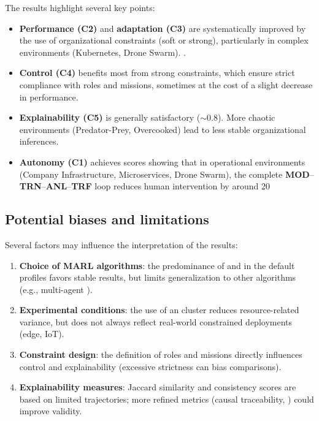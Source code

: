   The results highlight several key points:
  \begin{itemize}
  \item \textbf{Performance (C2)} and \textbf{adaptation (C3)} are systematically improved by the use of organizational constraints (soft or strong), particularly in complex environments (Kubernetes, Drone Swarm).
  .
  \item \textbf{Control (C4)} benefits most from strong constraints, which ensure strict compliance with roles and missions, sometimes at the cost of a slight decrease in performance.
  \item \textbf{Explainability (C5)} is generally satisfactory ($\sim 0.8$). More chaotic environments (Predator-Prey, Overcooked) lead to less stable organizational inferences.
  \item \textbf{Autonomy (C1)} achieves scores showing that in operational environments (Company Infrastructure, Microservices, Drone Swarm), the complete \textbf{MOD}–\textbf{TRN}–\textbf{ANL}–\textbf{TRF} loop reduces human intervention by around 20%
  \end {itemize}

  \subsection{Potential biases and limitations}

  Several factors may influence the interpretation of the results:
  \begin{enumerate}[label={\alph*)}]
    \item \textbf{Choice of MARL algorithms}: the predominance of  and  in the default profiles favors stable results, but limits generalization to other algorithms (e.g., multi-agent ).
    \item \textbf{Experimental conditions}: the use of an  cluster reduces resource-related variance, but does not always reflect real-world constrained deployments (edge, IoT).
    \item \textbf{Constraint design}: the definition of roles and missions directly influences control and explainability (excessive strictness can bias comparisons).
    \item \textbf{Explainability measures}: Jaccard similarity and consistency scores are based on limited trajectories; more refined metrics (causal traceability, ) could improve validity.
  \end{enumerate}

